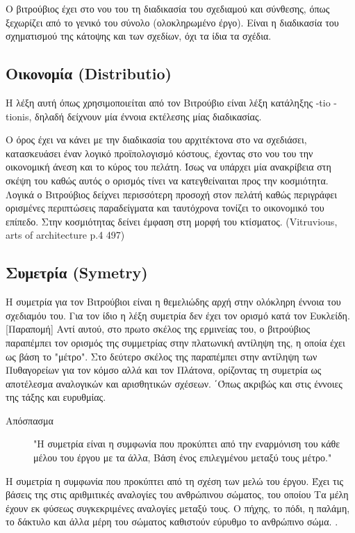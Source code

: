   Ο βιτρούβιος έχει στο νου του τη διαδικασία του σχεδιαμού και σύνθεσης, όπως ξεχωρίζει από το γενικό του σύνολο (ολοκληρωμένο έργο). Είναι η διαδικασία του σχηματισμού της κάτοψης και των σχεδίων, όχι τα ίδια τα σχέδια.
  
\subsection{Οικονομία (Distributio)}

  Η λέξη αυτή όπως χρησιμοποιείται από τον Βιτρούβιο είναι λέξη κατάληξης -tio -tionis, δηλαδή δείχνουν μία έννοια εκτέλεσης μίας διαδικασίας.
  
  Ο όρος έχει να κάνει με την διαδικασία του αρχιτέκτονα στο να σχεδιάσει, κατασκευάσει έναν λογικό προϊπολογισμό κόστους, έχοντας στο νου του την οικονομική άνεση και το κύρος του πελάτη. Ίσως να υπάρχει μία ανακρίβεια στη σκέψη του καθώς αυτός ο ορισμός τίνει να κατεγθείναιται προς την κοσμιότητα. Λογικά ο Βιτρούβιος δείχνει περισσότερη προσοχή στον πελάτή καθώς περιγράφει ορισμένες περιπτώσεις παραδείγματα και ταυτόχρονα τονίζει το οικονομικό του επίπεδο. Στην κοσμιότητας δείνει έμφαση στη μορφή του κτίσματος. (Vitruvious, arts of architecture p.4 497)
  
\subsection{Συμετρία (Symetry)}

  Η συμετρία για τον Βιτρούβιοι είναι η θεμελιώδης αρχή στην ολόκληρη έννοια του σχεδιαμόυ του. Για τον ίδιο η λέξη συμετρία δεν έχει τον ορισμό κατά τον Ευκλείδη. [Παραπομή] Αντί αυτού, στο πρωτο σκέλος της ερμινείας του, ο βιτρούβιος παραπέμπει τον ορισμός της συμμετρίας στην πλατωνική αντίληψη της, η οποία έχει ως βάση το "μέτρο". Στο δεύτερο σκέλος της παραπέμπει στην αντίληψη των Πυθαγορείων για τον κόμσο αλλά και τον Πλάτονα, ορίζοντας τη συμετρία ως αποτέλεσμα αναλογικών και αρισθητικών σχέσεων. ΄Όπως ακριβώς και στις έννοιες της τάξης και ευρυθμίας. \Cite[σ.~51,96]{vitruvius-lefas}

  \begin{description}
    \item[Απόσπασμα] "Η συμετρία είναι η συμφωνία που προκύπτει από την εναρμόνιση του κάθε μέλου του έργου με τα άλλα, Βάση ένος επιλεγμένου μεταξύ τους μέτρο."
  \end{description}

Η συμετρία η συμφωνία που προκύπτει από τη σχέση των μελώ του έργου. Έχει τις βάσεις της στις αριθμιτικές αναλογίες του ανθρώπινου σώματος, του οποίου Τα μέλη έχουν εκ φύσεως συγκεκριμένες αναλογίες μεταξύ τους. Ο πήχης, το πόδι, η παλάμη, το δάκτυλο και άλλα μέρη του σώματος καθιστούν εύρυθμο το ανθρώπινο σώμα. \cite[σ.~51]{vitruvius-lefas}.

